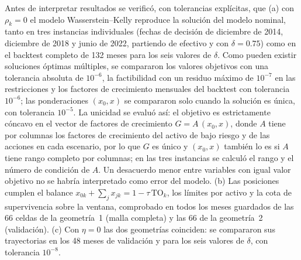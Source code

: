 Antes de interpretar resultados se verificó, con tolerancias explícitas, que (a) con $\rho_k=0$ el modelo Wasserstein--Kelly reproduce la solución del modelo nominal, tanto en tres instancias individuales (fechas de decisión de diciembre de 2014, diciembre de 2018 y junio de 2022, partiendo de efectivo y con $\delta=0.75$) como en el backtest completo de 132 meses para los seis valores de $\delta$. Como pueden existir soluciones óptimas múltiples, se compararon los valores objetivos con una tolerancia absoluta de $10^{-6}$, la factibilidad con un residuo máximo de $10^{-7}$ en las restricciones y los factores de crecimiento mensuales del backtest con tolerancia $10^{-6}$; las ponderaciones $(x_0,x)$ se compararon solo cuando la solución es única, con tolerancia $10^{-5}$. La unicidad se evaluó así: el objetivo es estrictamente cóncavo en el vector de factores de crecimiento $G=A\,(x_0,x)$, donde $A$ tiene por columnas los factores de crecimiento del activo de bajo riesgo y de las acciones en cada escenario, por lo que $G$ es único y $(x_0,x)$ también lo es si $A$ tiene rango completo por columnas; en las tres instancias se calculó el rango y el número de condición de $A$. Un desacuerdo menor entre variables con igual valor objetivo no se habría interpretado como error del modelo. (b) Las posiciones cumplen el balance $x_{0k}+\sum_j x_{jk}=1-\tau\,\mathrm{TO}_k$, los límites por activo y la cota de supervivencia sobre la ventana, comprobado en todos los meses guardados de las 66 celdas de la geometría~1 (malla completa) y las 66 de la geometría~2 (validación). (c) Con $\eta=0$ las dos geometrías coinciden: se compararon sus trayectorias en los 48 meses de validación y para los seis valores de $\delta$, con tolerancia $10^{-8}$.
